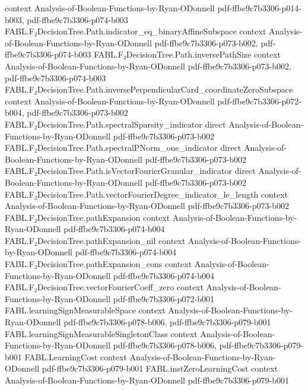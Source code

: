 \begin{theorem}
  {context}
  {Analysis-of-Boolean-Functions-by-Ryan-ODonnell}
  {pdf-ffbe9c7b3306-p014-b003,
    pdf-ffbe9c7b3306-p074-b003}
\proofstep
  {FABL.F₂DecisionTree.Path.indicator_eq_binaryAffineSubspace}
  {context}
  {Analysis-of-Boolean-Functions-by-Ryan-ODonnell}
  {pdf-ffbe9c7b3306-p073-b002,
    pdf-ffbe9c7b3306-p074-b003}
\proofstep
  {FABL.F₂DecisionTree.Path.inversePathSize}
  {context}
  {Analysis-of-Boolean-Functions-by-Ryan-ODonnell}
  {pdf-ffbe9c7b3306-p073-b002,
    pdf-ffbe9c7b3306-p074-b003}
\proofstep
  {FABL.F₂DecisionTree.Path.inversePerpendicularCard_coordinateZeroSubspace}
  {context}
  {Analysis-of-Boolean-Functions-by-Ryan-ODonnell}
  {pdf-ffbe9c7b3306-p072-b004,
    pdf-ffbe9c7b3306-p073-b002}
\proofstep
  {FABL.F₂DecisionTree.Path.spectralSparsity_indicator}
  {direct}
  {Analysis-of-Boolean-Functions-by-Ryan-ODonnell}
  {pdf-ffbe9c7b3306-p073-b002}
\proofstep
  {FABL.F₂DecisionTree.Path.spectralPNorm_one_indicator}
  {direct}
  {Analysis-of-Boolean-Functions-by-Ryan-ODonnell}
  {pdf-ffbe9c7b3306-p073-b002}
\proofstep
  {FABL.F₂DecisionTree.Path.isVectorFourierGranular_indicator}
  {direct}
  {Analysis-of-Boolean-Functions-by-Ryan-ODonnell}
  {pdf-ffbe9c7b3306-p073-b002}
\proofstep
  {FABL.F₂DecisionTree.Path.vectorFourierDegree_indicator_le_length}
  {context}
  {Analysis-of-Boolean-Functions-by-Ryan-ODonnell}
  {pdf-ffbe9c7b3306-p073-b002}
\proofstep
  {FABL.F₂DecisionTree.pathExpansion}
  {context}
  {Analysis-of-Boolean-Functions-by-Ryan-ODonnell}
  {pdf-ffbe9c7b3306-p074-b004}
\proofstep
  {FABL.F₂DecisionTree.pathExpansion_nil}
  {context}
  {Analysis-of-Boolean-Functions-by-Ryan-ODonnell}
  {pdf-ffbe9c7b3306-p074-b004}
\proofstep
  {FABL.F₂DecisionTree.pathExpansion_cons}
  {context}
  {Analysis-of-Boolean-Functions-by-Ryan-ODonnell}
  {pdf-ffbe9c7b3306-p074-b004}
\proofstep
  {FABL.F₂DecisionTree.vectorFourierCoeff_zero}
  {context}
  {Analysis-of-Boolean-Functions-by-Ryan-ODonnell}
  {pdf-ffbe9c7b3306-p072-b001}
\proofstep
  {FABL.learningSignMeasurableSpace}
  {context}
  {Analysis-of-Boolean-Functions-by-Ryan-ODonnell}
  {pdf-ffbe9c7b3306-p078-b006,
    pdf-ffbe9c7b3306-p079-b001}
\proofstep
  {FABL.learningSignMeasurableSingletonClass}
  {context}
  {Analysis-of-Boolean-Functions-by-Ryan-ODonnell}
  {pdf-ffbe9c7b3306-p078-b006,
    pdf-ffbe9c7b3306-p079-b001}
\proofstep
  {FABL.LearningCost}
  {context}
  {Analysis-of-Boolean-Functions-by-Ryan-ODonnell}
  {pdf-ffbe9c7b3306-p079-b001}
\proofstep
  {FABL.instZeroLearningCost}
  {context}
  {Analysis-of-Boolean-Functions-by-Ryan-ODonnell}
  {pdf-ffbe9c7b3306-p079-b001}
\proofstep

\end{theorem}
